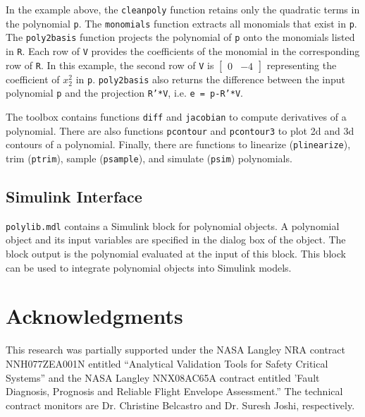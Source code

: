 \documentclass{article}
\newcommand{\bsmtx}{\left[ \begin{smallmatrix}}
\newcommand{\esmtx}{\end{smallmatrix} \right]}
\begin{document}
In the example above, the \texttt{cleanpoly} function retains only the
quadratic terms in the polynomial \texttt{p}.  The \texttt{monomials}
function extracts all monomials that exist in \texttt{p}.  The
\texttt{poly2basis} function projects the polynomial of \texttt{p}
onto the monomials listed in \texttt{R}.  Each row of \texttt{V}
provides the coefficients of the monomial in the corresponding row of
\texttt{R}.  In this example, the second row of \texttt{V} is $\bsmtx
0 & -4 \esmtx$ representing the coefficient of $x_2^2$ in \texttt{p}.
\texttt{poly2basis} also returns the difference between the input
polynomial \texttt{p} and the projection \texttt{R'*V}, i.e.
\texttt{e = p-R'*V}.


The toolbox contains functions \texttt{diff} and \texttt{jacobian} to
compute derivatives of a polynomial.  There are also functions
\texttt{pcontour} and \texttt{pcontour3} to plot 2d and 3d contours of
a polynomial.  Finally, there are functions to linearize
(\texttt{plinearize}), trim (\texttt{ptrim}), sample
(\texttt{psample}), and simulate (\texttt{psim}) polynomials.

\subsection{Simulink Interface}

\texttt{polylib.mdl} contains a Simulink block for polynomial objects.
A polynomial object and its input variables are specified in the
dialog box of the object.  The block output is the polynomial evaluated
at the input of this block.  This block can be used to integrate polynomial
objects into Simulink models.

\section{Acknowledgments}

This research was partially supported under the NASA Langley NRA
contract NNH077ZEA001N entitled ``Analytical Validation Tools for Safety
Critical Systems'' and the NASA Langley NNX08AC65A contract
entitled 'Fault Diagnosis, Prognosis and Reliable Flight
Envelope Assessment.'' The technical contract monitors are Dr. Christine
Belcastro and Dr. Suresh Joshi, respectively.

%
\end{document}
